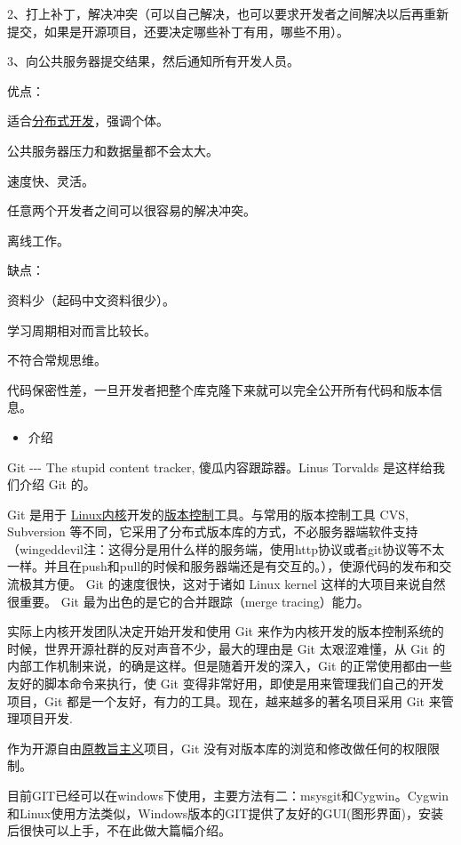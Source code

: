 \documentclass[
]{article}
\begin{document}
2、打上补丁，解决冲突（可以自己解决，也可以要求开发者之间解决以后再重新提交，如果是开源项目，还要决定哪些补丁有用，哪些不用）。

3、向公共服务器提交结果，然后通知所有开发人员。

优点：

适合\href{https://baike.baidu.com/item/分布式开发}{分布式开发}，强调个体。

公共服务器压力和数据量都不会太大。

速度快、灵活。

任意两个开发者之间可以很容易的解决冲突。

离线工作。

缺点：

资料少（起码中文资料很少）。

学习周期相对而言比较长。

不符合常规思维。

代码保密性差，一旦开发者把整个库克隆下来就可以完全公开所有代码和版本信息。

\begin{itemize}
\item
  介绍
\end{itemize}

Git -\/-\/- The stupid content tracker, 傻瓜内容跟踪器。Linus Torvalds
是这样给我们介绍 Git 的。

Git 是用于
\href{https://baike.baidu.com/item/Linux内核/10142820}{Linux内核}开发的\href{https://baike.baidu.com/item/版本控制}{版本控制}工具。与常用的版本控制工具
CVS, Subversion
等不同，它采用了分布式版本库的方式，不必服务器端软件支持（wingeddevil注：这得分是用什么样的服务端，使用http协议或者git协议等不太一样。并且在push和pull的时候和服务器端还是有交互的。），使源代码的发布和交流极其方便。
Git 的速度很快，这对于诸如 Linux kernel 这样的大项目来说自然很重要。 Git
最为出色的是它的合并跟踪（merge tracing）能力。

实际上内核开发团队决定开始开发和使用 Git
来作为内核开发的版本控制系统的时候，世界开源社群的反对声音不少，最大的理由是
Git 太艰涩难懂，从 Git
的内部工作机制来说，的确是这样。但是随着开发的深入，Git
的正常使用都由一些友好的脚本命令来执行，使 Git
变得非常好用，即使是用来管理我们自己的开发项目，Git
都是一个友好，有力的工具。现在，越来越多的著名项目采用 Git
来管理项目开发.

作为开源自由\href{https://baike.baidu.com/item/原教旨主义/92753}{原教旨主义}项目，Git
没有对版本库的浏览和修改做任何的权限限制。

目前GIT已经可以在windows下使用，主要方法有二：msysgit和Cygwin。Cygwin和Linux使用方法类似，Windows版本的GIT提供了友好的GUI(图形界面)，安装后很快可以上手，不在此做大篇幅介绍。
\end{document}
